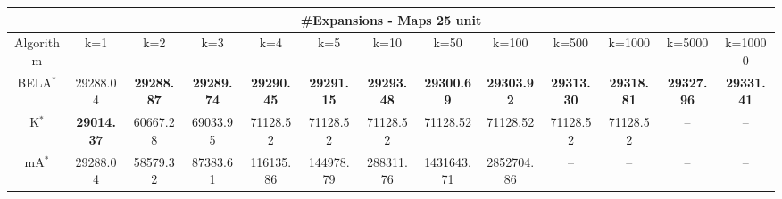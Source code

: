 \begin{tabular}{c|cccccccccccc}\toprule
\multicolumn{13}{c}{#Expansions - Maps 25 unit}\\ \midrule
Algorithm & k=1 & k=2 & k=3 & k=4 & k=5 & k=10 & k=50 & k=100 & k=500 & k=1000 & k=5000 & k=10000 \\ \midrule
BELA$^*$ & 29288.04 & \textbf{29288.87} & \textbf{29289.74} & \textbf{29290.45} & \textbf{29291.15} & \textbf{29293.48} & \textbf{29300.69} & \textbf{29303.92} & \textbf{29313.30} & \textbf{29318.81} & \textbf{29327.96} & \textbf{29331.41} \\
K$^*$ & \textbf{29014.37} & 60667.28 & 69033.95 & 71128.52 & 71128.52 & 71128.52 & 71128.52 & 71128.52 & 71128.52 & 71128.52 & -- & -- \\
mA$^*$ & 29288.04 & 58579.32 & 87383.61 & 116135.86 & 144978.79 & 288311.76 & 1431643.71 & 2852704.86 & -- & -- & -- & -- \\ \bottomrule 
\end{tabular}
